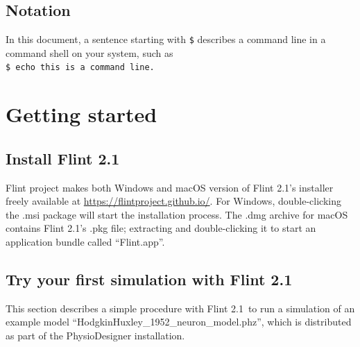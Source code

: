 \documentclass[a4paper,10pt]{report}
\def\FlintVersion{2.1}
\def\Flint{Flint \FlintVersion}
\begin{document}
\section{Notation}
In this document, a sentence starting with {\tt \$} describes a command line in
a command shell on your system, such as\\
{\tt \$ echo this is a command line.}



\chapter{Getting started}

\section{Install \Flint}
Flint project makes both Windows and macOS version of \Flint's installer freely
available at \url{https://flintproject.github.io/}.
For Windows, double-clicking the .msi package will start the installation
process.
The .dmg archive for macOS contains \Flint's .pkg file; extracting and
double-clicking it to start an application bundle called ``Flint.app''.

\section{Try your first simulation with \Flint}
This section describes a simple procedure with \Flint\ to run a simulation of an
example model ``HodgkinHuxley\_1952\_neuron\_model.phz'', which is distributed
as part of the PhysioDesigner \cite{PhysioDesigner} installation.
\end{document}
